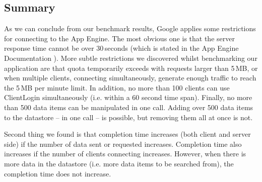 % 
% 
% 
% 
% 
\subsection{Summary}
As we can conclude from our benchmark results, Google applies some restrictions
for connecting to the App Engine. The most obvious one is that the
server response time cannot be over 30\,seconds (which is stated in the App
Engine Documentation \cite{app-engine-quotas}). More subtle restrictions we
discovered whilst benchmarking our application are that quota temporarily exceeds
with requests larger than 5\,MB, or when multiple clients, connecting
simultaneously, generate enough traffic to reach the 5\,MB per minute limit.
In addition, no more than 100 clients can use ClientLogin simultaneously (i.e.
within a 60 second time span). Finally, no more than 500 data items can be
manipulated in one call. Adding over 500 data items to the datastore -- in one
call -- is possible, but removing them all at once is not.

Second thing we found is that completion time increases (both client and server
side) if the number of data sent or requested increases. Completion time also
increases if the number of clients connecting increases. However, when there is
more data in the datastore (i.e. more data items to be searched from), the
completion time does not increase.

